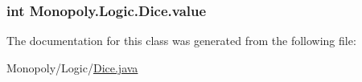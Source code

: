 \subsubsection[{\texorpdfstring{value}{value}}]{\setlength{\rightskip}{0pt plus 5cm}int Monopoly.\+Logic.\+Dice.\+value\hspace{0.3cm}{\ttfamily [private]}}\hypertarget{class_monopoly_1_1_logic_1_1_dice_a2d20f27db8eb52b2ca264412dde4b566}{}\label{class_monopoly_1_1_logic_1_1_dice_a2d20f27db8eb52b2ca264412dde4b566}


The documentation for this class was generated from the following file\+:\begin{DoxyCompactItemize}
\item 
Monopoly/\+Logic/\hyperlink{_dice_8java}{Dice.\+java}\end{DoxyCompactItemize}
